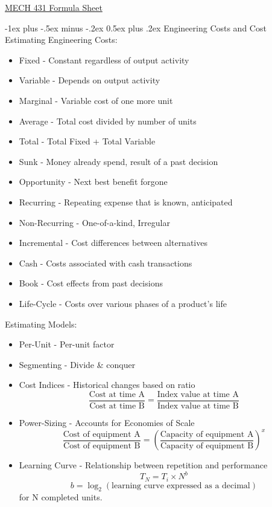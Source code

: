 \documentclass[12pt,landscape]{article}
\makeatletter
\renewcommand{\section}{\@startsection{section}{1}{0mm}%
                                {-1ex plus -.5ex minus -.2ex}%
                                {0.5ex plus .2ex}%
                                {\normalfont\normalsize\bfseries}}
\makeatother
\begin{document}
\raggedright
\footnotesize
\begin{multicols*}{3}

\setlength{\premulticols}{1pt}
\setlength{\postmulticols}{1pt}
\setlength{\multicolsep}{1pt}
\setlength{\columnsep}{2pt}

\begin{center}
	\Large{\underline{MECH 431 Formula Sheet}}
\end{center}

\section{Engineering Costs and Cost Estimating}
Engineering Costs:
\begin{itemize}
	\itemsep 0em
	\item Fixed - Constant regardless of output activity
	\item Variable - Depends on output activity
	\item Marginal - Variable cost of one more unit
	\item Average - Total cost divided by number of units
	\item Total - Total Fixed + Total Variable
	\item Sunk - Money already spend, result of a past decision
	\item Opportunity - Next best benefit forgone
	\item Recurring - Repeating expense that is known, anticipated
	\item Non-Recurring - One-of-a-kind, Irregular
	\item Incremental - Cost differences between alternatives
	\item Cash - Costs associated with cash transactions
	\item Book - Cost effects from past decisions
	\item Life-Cycle - Costs over various phases of a product's life
\end{itemize}

Estimating Models:
\begin{itemize}
	\itemsep 0em
	\item Per-Unit - Per-unit factor
	\item Segmenting - Divide \& conquer
	\item Cost Indices - Historical changes based on ratio
	$$\frac{\text{Cost at time A}}{\text{Cost at time B}} = \frac{\text{Index value at time A}}{\text{Index value at time B}}$$
	\item Power-Sizing - Accounts for Economies of Scale
	$$\frac{\text{Cost of equipment A}}{\text{Cost of equipment B}} = \left(\frac{\text{Capacity of equipment A}}{\text{Capacity of equipment B}}\right)^x$$
	\item Learning Curve - Relationship between repetition and performance
	$$T_N = T_i \times N^b$$
	$$b = \log_2(\text{learning curve expressed as a decimal})$$
	for N completed units.
\end{itemize}


\end{multicols*}
\end{document}
